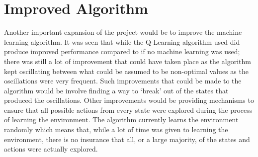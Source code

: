\section{Improved Algorithm}
Another important expansion of the project would be to improve the machine learning algorithm. It was seen that while the Q-Learning algorithm used did produce improved performance compared to if no machine learning was used; there was still a lot of improvement that could have taken place as the algorithm kept oscillating between what could be assumed to be non-optimal values as the oscillations were very frequent. Such improvements that could be made to the algorithm would be involve finding a way to `break' out of the states that produced the oscillations. Other improvements would be providing mechanisms to ensure that all possible actions from every state were explored during the process of learning the environment. The algorithm currently learns the environment randomly which means that, while a lot of time was given to learning the environment, there is no insurance that all, or a large majority, of the states and actions were actually explored.
